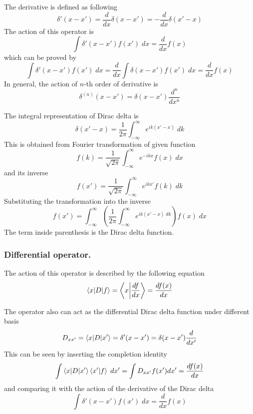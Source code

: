 \documentclass[../main.tex]{subfiles}
\begin{document}
The derivative is defined as following
\begin{equation*}
	\delta'(x-x')=\frac{d }{dx}\delta(x-x')=-\frac{d }{dx}\delta(x'-x)
\end{equation*}
The action of this operator is
\begin{equation*}
	\int\delta'(x-x')f(x')\;dx=\frac{d }{dx} f(x)
\end{equation*}
which can be proved by
\begin{equation*}
	\int\delta'(x-x')f(x')\;dx=\frac{d }{dx }\int\delta(x-x')f(x')\;dx=\frac{d }{dx}f(x)
\end{equation*}
In general, the action of $n$-th order of derivative is
\begin{equation*}
	\delta^{(n)}(x-x')=\delta(x-x')\frac{d^n }{dx^n}
\end{equation*}

The integral representation of Dirac delta is
\begin{equation*}
	\delta(x'-x)=\frac{1 }{2\pi} \int_{-\infty}^{\infty} e^{ik(x'-x)}\;dk
\end{equation*}
This is obtained from Fourier transformation of given function
\begin{equation*}
	f(k)=\frac{1 }{\sqrt{2\pi }}\int_{-\infty}^{\infty} e^{-ikx}f(x)\;dx
\end{equation*}
and its inverse
\begin{equation*}
	f(x')=\frac{1 }{\sqrt{2\pi }}\int_{-\infty}^{\infty} e^{ikx'}f(k)\;dk
\end{equation*}
Substituting the transformation into the inverse
\begin{equation*}
	f(x')=\int_{-\infty}^{\infty} \left(\frac{1 }{2\pi}\int_{-\infty}^{\infty} e^{ik(x'-x)\;dk}\right)f(x)\;dx
\end{equation*}
The term inside parenthesis is the Dirac delta function.

\subsubsection{Differential operator.}
The action of this operator is described by the following equation
\begin{equation*}
	\braket{x|D|f}=\left\langle x\bigg| \frac{df }{dx}\right\rangle=\frac{df(x)}{dx}
\end{equation*}

The operator also can act as the differential Dirac delta function under different basis
\begin{equation*}
	D_{xx'}=\braket{x|D|x'}=\delta'(x-x')=\delta(x-x')\frac{d }{dx'}
\end{equation*}
This can be seen by inserting the completion identity
\begin{equation*}
	\int \braket{x|D|x'}\braket{x'|f}\;dx'=\int D_{xx'}f(x')dx'=\frac{df(x)}{dx}
\end{equation*}
and comparing it with the action of the derivative of the Dirac delta
\begin{equation*}
	\int\delta'(x-x')f(x')\;dx=\frac{d }{dx} f(x)
\end{equation*}
\end{document}
